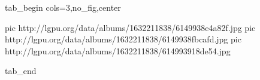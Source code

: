  
 
 
 
 


\ifcmt
  tab_begin cols=3,no_fig,center

     pic http://lgpu.org/data/albums/1632211838/6149938e4a82f.jpg
		 pic http://lgpu.org/data/albums/1632211838/6149938fbcafd.jpg
		 pic http://lgpu.org/data/albums/1632211838/614993918de54.jpg

  tab_end
\fi
